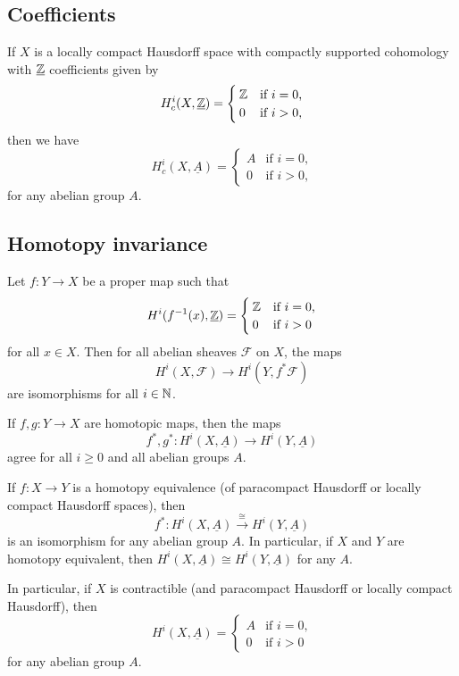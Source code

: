 \subsection{Coefficients}

\begin{lem}[name={\cref{cor:coefficients-cohomology-integers}}]
If \(X\) is a locally compact Hausdorff space with compactly supported cohomology with \(\underline{\mathbb{Z}}\) coefficients given by
\[ H^i_c(X,\underline{\mathbb{Z}}) =
  \begin{cases}
    \mathbb{Z} & \text{if } i=0\text{,} \\
    0 & \text{if } i>0\text{,}
  \end{cases}
\]
then we have
\[ H^i_c(X,\underline{A}) =
  \begin{cases}
    A & \text{if } i=0\text{,} \\
    0 & \text{if } i>0\text{,}
  \end{cases}
\]
for any abelian group \(A\).
\end{lem}

\subsection{Homotopy invariance}

\begin{thm}[name={Vietoris--Begle mapping theorem, \cref{thm:Vietoris-Begle-mapping-theorem}}]
Let \(f\colon Y\to X\) be a proper map such that
\[ H^i(f^{-1}(x),\underline{\mathbb{Z}}) =
  \begin{cases}
    \mathbb{Z} & \text{if } i = 0\text{,} \\
    0 & \text{if } i>0
  \end{cases}
\]
for all \(x\in X\).
Then for all abelian sheaves \(\mathcal F\) on \(X\), the maps
\[ H^i(X,\mathcal F)\to H^i(Y,f^*\mathcal F) \]
are isomorphisms for all \(i\in\mathbb{N}\).
\end{thm}

\begin{cor}[name={\cref{cor:sheaf-cohomology-homotopy-invariant}}]
If \(f,g\colon Y\to X\) are homotopic maps, then the maps
\[ f^*,g^*\colon H^i(X,\underline{A}) \to H^i(Y,\underline{A}) \]
agree for all \(i\geq 0\) and all abelian groups \(A\).
\end{cor}

\begin{cor}[name={\cref{cor:sheaf-cohomology-homotopy-equivalence}}]
If \(f\colon X\to Y\) is a homotopy equivalence (of paracompact Hausdorff or locally compact Hausdorff spaces), then
\[ f^*\colon H^i(X,\underline{A})\xrightarrow{\cong} H^i(Y,\underline{A}) \]
is an isomorphism for any abelian group \(A\).
In particular, if \(X\) and \(Y\) are homotopy equivalent, then \(H^i(X,\underline{A})\cong H^i(Y,\underline{A})\) for any \(A\).

In particular, if \(X\) is contractible (and paracompact Hausdorff or locally compact Hausdorff), then
\[ H^i(X,\underline{A}) =
  \begin{cases}
    A & \text{if } i = 0\text{,} \\
    0 & \text{if } i > 0
  \end{cases}
\]
for any abelian group \(A\).
\end{cor}

